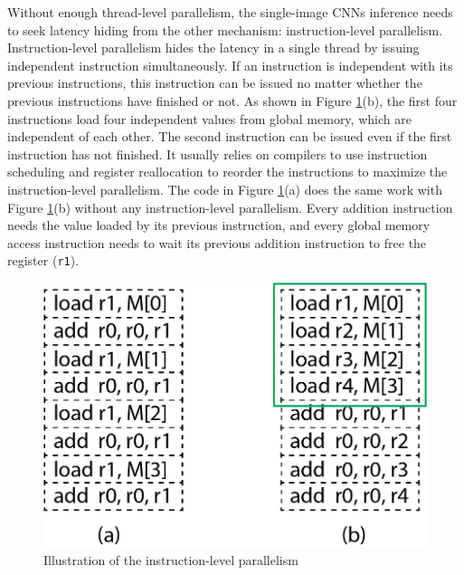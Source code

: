 \documentclass{article}
\begin{document}
Without enough thread-level parallelism, the single-image CNNs inference needs to seek latency hiding from the other mechanism: instruction-level parallelism. Instruction-level parallelism hides the latency in a single thread by issuing independent instruction simultaneously. If an instruction is independent with its previous instructions, this instruction can be issued no matter whether the previous instructions have finished or not. As shown in Figure \ref{ilp_fig}(b), the first four instructions load four independent values from global memory, which are independent of each other. The second instruction can be issued even if the first instruction has not finished. It usually relies on compilers to use instruction scheduling and register reallocation to reorder the instructions to maximize the instruction-level parallelism. The code in Figure \ref{ilp_fig}(a) does the same work with Figure \ref{ilp_fig}(b) without any instruction-level parallelism. Every addition instruction needs the value loaded by its previous instruction, and every global memory access instruction needs to wait its previous addition instruction to free the register (\texttt{r1}).

\begin{figure}[h!]
\centering

\includegraphics[width=0.45\linewidth]{ilp.png}

\caption{Illustration of the instruction-level parallelism \label{ilp_fig}}

\end{figure}



\end{document}
